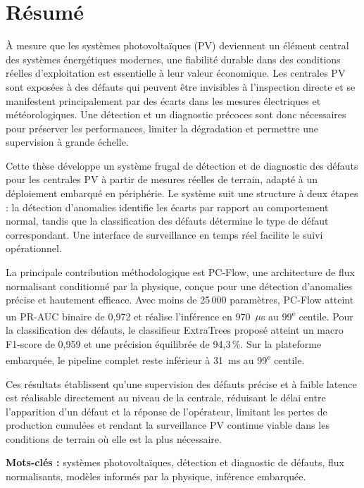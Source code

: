 \chapter*{Résumé}

À mesure que les systèmes photovoltaïques (PV) deviennent un élément central des systèmes énergétiques modernes, une fiabilité durable dans des conditions réelles d'exploitation est essentielle à leur valeur économique. Les centrales PV sont exposées à des défauts qui peuvent être invisibles à l'inspection directe et se manifestent principalement par des écarts dans les mesures électriques et météorologiques. Une détection et un diagnostic précoces sont donc nécessaires pour préserver les performances, limiter la dégradation et permettre une supervision à grande échelle.

Cette thèse développe un système frugal de détection et de diagnostic des défauts pour les centrales PV à partir de mesures réelles de terrain, adapté à un déploiement embarqué en périphérie. Le système suit une structure à deux étapes : la détection d'anomalies identifie les écarts par rapport au comportement normal, tandis que la classification des défauts détermine le type de défaut correspondant. Une interface de surveillance en temps réel facilite le suivi opérationnel.

La principale contribution méthodologique est PC-Flow, une architecture de flux normalisant conditionné par la physique, conçue pour une détection d'anomalies précise et hautement efficace. Avec moins de 25\,000 paramètres, PC-Flow atteint un PR-AUC binaire de 0{,}972 et réalise l'inférence en 970~$\mu$s au 99\textsuperscript{e} centile. Pour la classification des défauts, le classifieur ExtraTrees proposé atteint un macro F1-score de 0{,}959 et une précision équilibrée de 94{,}3\,\%. Sur la plateforme embarquée, le pipeline complet reste inférieur à 31~ms au 99\textsuperscript{e} centile.

Ces résultats établissent qu'une supervision des défauts précise et à faible latence est réalisable directement au niveau de la centrale, réduisant le délai entre l'apparition d'un défaut et la réponse de l'opérateur, limitant les pertes de production cumulées et rendant la surveillance PV continue viable dans les conditions de terrain où elle est la plus nécessaire.

\vspace{1cm}
\noindent\textbf{Mots-clés :} systèmes photovoltaïques, détection et diagnostic de défauts, flux normalisants, modèles informés par la physique, inférence embarquée.
